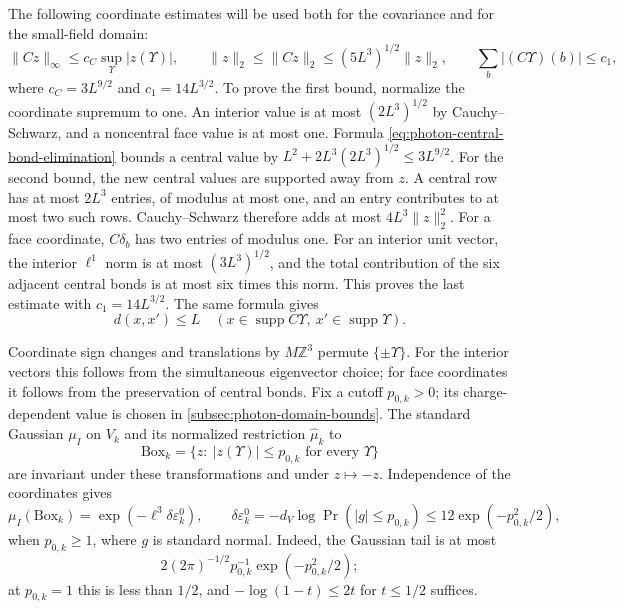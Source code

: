 \documentclass[11pt,letterpaper,reqno]{amsart}
\newcommand{\Z}{\mathbb Z}
\DeclareMathOperator{\supp}{supp}
\begin{document}
The following coordinate estimates will be used both for the
covariance and for the small-field domain:
\begin{equation}\label{eq:photon-coordinate-estimates}
 \|Cz\|_\infty\le c_C\sup_\Upsilon|z(\Upsilon)|,
 \qquad
 \|z\|_2\le\|Cz\|_2\le(5L^3)^{1/2}\|z\|_2,
 \qquad
 \sum_b|(C\Upsilon)(b)|\le c_1,
\end{equation}
where $c_C=3L^{9/2}$ and $c_1=14L^{3/2}$. To prove the first
bound, normalize the coordinate supremum to one. An interior value
is at most $(2L^3)^{1/2}$ by Cauchy--Schwarz, and a noncentral face
value is at most one. Formula
\eqref{eq:photon-central-bond-elimination} bounds a central value
by $L^2+2L^3(2L^3)^{1/2}\le3L^{9/2}$.
For the second bound, the new central values are supported away
from $z$. A central row has at most $2L^3$ entries, of modulus at
most one, and an entry contributes to at most two such rows.
Cauchy--Schwarz therefore adds at most $4L^3\|z\|_2^2$.
For a face coordinate, $C\delta_b$ has two entries of modulus one.
For an interior unit vector, the interior $\ell^1$ norm is at most
$(3L^3)^{1/2}$, and the total contribution of the six adjacent
central bonds is at most six times this norm. This proves the
last estimate with $c_1=14L^{3/2}$.
The same formula gives
\begin{equation}\label{eq:photon-coordinate-support}
 d(x,x')\le L\quad
 (x\in\supp C\Upsilon,\ x'\in\supp\Upsilon).
\end{equation}

Coordinate sign changes and translations by $M\Z^3$ permute
$\{\pm\Upsilon\}$. For the interior vectors this follows from the
simultaneous eigenvector choice; for face coordinates it follows
from the preservation of central bonds. Fix a cutoff $p_{0,k}>0$;
its charge-dependent value is chosen in
\cref{subsec:photon-domain-bounds}.
The standard Gaussian
$\mu_I$ on $V_k$ and its normalized restriction $\widehat\mu_k$ to
\[
 \mathrm{Box}_k=
 \{z:\ |z(\Upsilon)|\le p_{0,k}\text{ for every }\Upsilon\}
\]
are invariant under these transformations and under $z\mapsto-z$.
Independence of the coordinates gives
\begin{equation}\label{eq:photon-Gaussian-box-mass}
 \mu_I(\mathrm{Box}_k)=\exp(-\ell^3\delta\varepsilon^0_k),
 \qquad
 \delta\varepsilon^0_k=-d_V\log\Pr(|g|\le p_{0,k})
            \le12\exp(-p_{0,k}^2/2),
\end{equation}
when $p_{0,k}\ge1$, where $g$ is standard normal.
Indeed, the Gaussian tail is at most
\[
 2(2\pi)^{-1/2}p_{0,k}^{-1}\exp(-p_{0,k}^2/2);
\]
at
$p_{0,k}=1$ this is less than $1/2$, and
$-\log(1-t)\le2t$ for $t\le1/2$ suffices.
\end{document}
